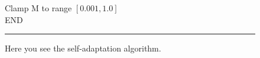 \begin{figure}[htbp]
\begin{center}
\begin{varwidth}{\textwidth}
{\tab Clamp M to range $[0.001,1.0]$ \\
END \\
}
\end{varwidth}
\end{center}
\centering
\rule{35em}{0.5pt}
\caption[Self-adaptation Algorithm]{Here you see the self-adaptation algorithm.}
\label{fig:sa}
\end{figure}

